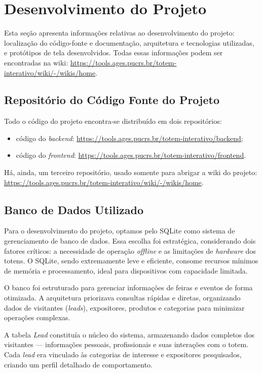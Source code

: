 \section[Desenvolvimento do Projeto]{Desenvolvimento do Projeto}

Esta seção apresenta informações relativas ao desenvolvimento do projeto: localização do código-fonte e documentação, arquitetura e tecnologias utilizadas, e protótipos de tela desenvolvidos. Todas essas informações podem ser encontradas na wiki: \url{https://tools.ages.pucrs.br/totem-interativo/wiki/-/wikis/home}.

\subsection{Repositório do Código Fonte do Projeto}
  Todo o código do projeto encontra-se distribuído em dois repositórios:
\begin{itemize}
    \item código do \textit{backend}: \url{https://tools.ages.pucrs.br/totem-interativo/backend};
    \item código do \textit{frontend}: \url{https://tools.ages.pucrs.br/totem-interativo/frontend}.
\end{itemize}

Há, ainda, um terceiro repositório, usado somente para abrigar a wiki do projeto: \url{https://tools.ages.pucrs.br/totem-interativo/wiki/-/wikis/home}.

\subsection{Banco de Dados Utilizado}
  Para o desenvolvimento do projeto, optamos pelo SQLite como sistema de gerenciamento de banco de dados. Essa escolha foi estratégica, considerando dois fatores críticos: a necessidade de operação \textit{offline} e as limitações de \textit{hardware} dos totens. O SQLite, sendo extremamente leve e eficiente, consome recursos mínimos de memória e processamento, ideal para dispositivos com capacidade limitada.

  O banco foi estruturado para gerenciar informações de feiras e eventos de forma otimizada. A arquitetura priorizava consultas rápidas e diretas, organizando dados de visitantes (\textit{leads}), expositores, produtos e categorias para minimizar operações complexas.

  A tabela \textit{Lead} constituía o núcleo do sistema, armazenando dados completos dos visitantes --- informações pessoais, profissionais e suas interações com o totem. Cada \textit{lead} era vinculado às categorias de interesse e expositores pesquisados, criando um perfil detalhado de comportamento.

